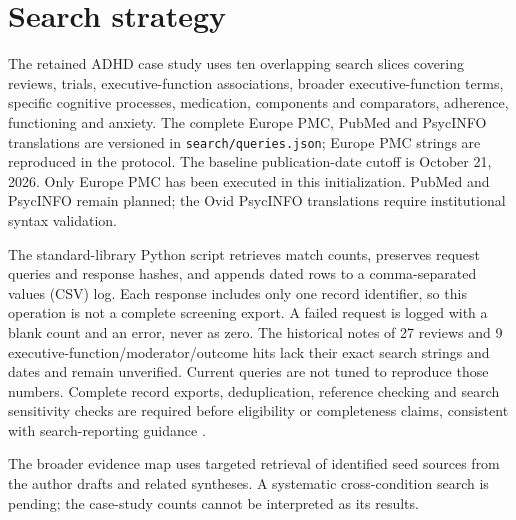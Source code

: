 \section{Search strategy}
\label{sec:search}
The retained ADHD case study uses ten overlapping search slices covering reviews, trials, executive-function associations, broader executive-function terms, specific cognitive processes, medication, components and comparators, adherence, functioning and anxiety.
The complete Europe PMC, PubMed and PsycINFO translations are versioned in \texttt{search/queries.json}; Europe PMC strings are reproduced in the protocol.
The baseline publication-date cutoff is October 21, 2026.
Only Europe PMC has been executed in this initialization.
PubMed and PsycINFO remain planned; the Ovid PsycINFO translations require institutional syntax validation.

The standard-library Python script retrieves match counts, preserves request queries and response hashes, and appends dated rows to a comma-separated values (CSV) log.
Each response includes only one record identifier, so this operation is not a complete screening export.
A failed request is logged with a blank count and an error, never as zero.
The historical notes of 27 reviews and 9 executive-function/moderator/outcome hits lack their exact search strings and dates and remain unverified.
Current queries are not tuned to reproduce those numbers.
Complete record exports, deduplication, reference checking and search sensitivity checks are required before eligibility or completeness claims, consistent with search-reporting guidance \citep{Rethlefsen2021}.

The broader evidence map uses targeted retrieval of identified seed sources from the author drafts and related syntheses.
A systematic cross-condition search is pending; the case-study counts cannot be interpreted as its results.
